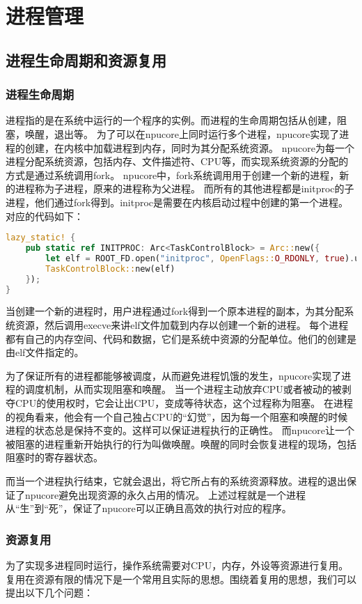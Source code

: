 \chapter{进程管理}
\section{进程生命周期和资源复用}
\subsection{进程生命周期}
进程指的是在系统中运行的一个程序的实例。而进程的生命周期包括从创建，阻塞，唤醒，退出等。
为了可以在npucore上同时运行多个进程，npucore实现了进程的创建，在内核中加载进程到内存，同时为其分配系统资源。
npucore为每一个进程分配系统资源，包括内存、文件描述符、CPU等，而实现系统资源的分配的方式是通过系统调用fork。
npucore中，fork系统调用用于创建一个新的进程，新的进程称为子进程，原来的进程称为父进程。
而所有的其他进程都是initproc的子进程，他们通过fork得到。initproc是需要在内核启动过程中创建的第一个进程。
对应的代码如下：
\begin{lstlisting}[language=rust]
    lazy_static! {
    pub static ref INITPROC: Arc<TaskControlBlock> = Arc::new({
        let elf = ROOT_FD.open("initproc", OpenFlags::O_RDONLY, true).unwrap();
        TaskControlBlock::new(elf)
    });
}
\end{lstlisting}
当创建一个新的进程时，用户进程通过fork得到一个原本进程的副本，为其分配系统资源，然后调用execve来讲elf文件加载到内存以创建一个新的进程。
每个进程都有自己的内存空间、代码和数据，它们是系统中资源的分配单位。他们的创建是由elf文件指定的。

为了保证所有的进程都能够被调度，从而避免进程饥饿的发生，npucore实现了进程的调度机制，从而实现阻塞和唤醒。
当一个进程主动放弃CPU或者被动的被剥夺CPU的使用权时，它会让出CPU，变成等待状态，这个过程称为阻塞。
在进程的视角看来，他会有一个自己独占CPU的“幻觉”，因为每一个阻塞和唤醒的时候进程的状态总是保持不变的。这样可以保证进程执行的正确性。
而npucore让一个被阻塞的进程重新开始执行的行为叫做唤醒。唤醒的同时会恢复进程的现场，包括阻塞时的寄存器状态。

而当一个进程执行结束，它就会退出，将它所占有的系统资源释放。进程的退出保证了npucore避免出现资源的永久占用的情况。
上述过程就是一个进程从“生”到“死”，保证了npucore可以正确且高效的执行对应的程序。

\subsection{资源复用}
为了实现多进程同时运行，操作系统需要对CPU，内存，外设等资源进行复用。
复用在资源有限的情况下是一个常用且实际的思想。围绕着复用的思想，我们可以提出以下几个问题：

